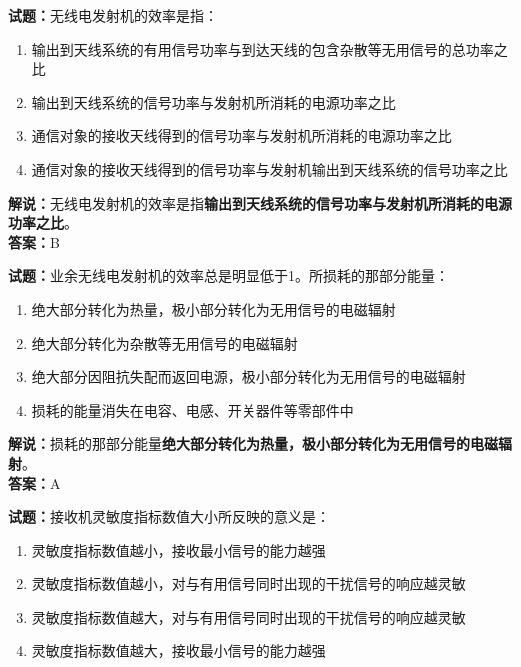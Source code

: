 \documentclass{ctexbook}
\begin{document}
\bigskip


\noindent\textbf{试题：}无线电发射机的效率是指：

\begin{enumerate}[leftmargin=3em]
	\item 输出到天线系统的有用信号功率与到达天线的包含杂散等无用信号的总功率之比
	\item 输出到天线系统的信号功率与发射机所消耗的电源功率之比
	\item 通信对象的接收天线得到的信号功率与发射机所消耗的电源功率之比
	\item 通信对象的接收天线得到的信号功率与发射机输出到天线系统的信号功率之比
\end{enumerate}

\noindent\textbf{解说：}无线电发射机的效率是指\textbf{输出到天线系统的信号功率与发射机所消耗的电源功率之比}。\\\noindent\textbf{答案：}B%


\bigskip


\noindent\textbf{试题：}业余无线电发射机的效率总是明显低于1。所损耗的那部分能量：

\begin{enumerate}[leftmargin=3em]
	\item 绝大部分转化为热量，极小部分转化为无用信号的电磁辐射
	\item 绝大部分转化为杂散等无用信号的电磁辐射
	\item 绝大部分因阻抗失配而返回电源，极小部分转化为无用信号的电磁辐射
	\item 损耗的能量消失在电容、电感、开关器件等零部件中
\end{enumerate}

\noindent\textbf{解说：}损耗的那部分能量\textbf{绝大部分转化为热量，极小部分转化为无用信号的电磁辐射}。\\\noindent\textbf{答案：}A%


\bigskip


\noindent\textbf{试题：}接收机灵敏度指标数值大小所反映的意义是：

\begin{enumerate}[leftmargin=3em]
	\item 灵敏度指标数值越小，接收最小信号的能力越强
	\item 灵敏度指标数值越小，对与有用信号同时出现的干扰信号的响应越灵敏
	\item 灵敏度指标数值越大，对与有用信号同时出现的干扰信号的响应越灵敏
	\item 灵敏度指标数值越大，接收最小信号的能力越强
\end{enumerate}
\end{document}
